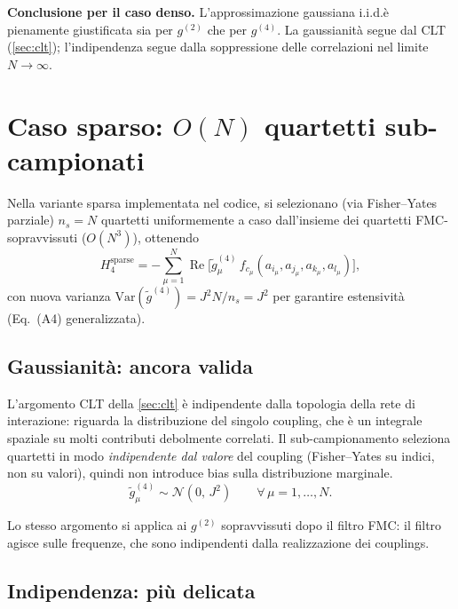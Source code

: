 \documentclass[11pt,a4paper]{article}
\newcommand{\re}{\operatorname{Re}}
\begin{document}
\bigskip
\noindent
\textbf{Conclusione per il caso denso.}
L'approssimazione gaussiana i.i.d.\@ \`e pienamente giustificata sia
per $g^{(2)}$ che per $g^{(4)}$. La gaussianit\`a segue dal CLT
(\cref{sec:clt}); l'indipendenza segue dalla soppressione delle
correlazioni nel limite $N \to \infty$.

\section{Caso sparso: $O(N)$ quartetti
         sub-campionati}\label{sec:sparse}

Nella variante sparsa implementata nel codice, si selezionano
(via Fisher--Yates parziale) $n_s = N$ quartetti uniformemente a caso
dall'insieme dei quartetti FMC-sopravvissuti ($O(N^3)$), ottenendo
\begin{equation}\label{eq:H4_sparse}
  H_4^{\mathrm{sparse}}
  = -\sum_{\mu=1}^{N} \re\!\bigl[
      \tilde g^{(4)}_\mu\, f_{c_\mu}(a_{i_\mu},a_{j_\mu},a_{k_\mu},a_{l_\mu})
    \bigr],
\end{equation}
con nuova varianza $\mathrm{Var}(\tilde g^{(4)}) = J^2 N / n_s = J^2$
per garantire estensivit\`a (Eq.~(A4) generalizzata).

\subsection{Gaussianit\`a: ancora valida}

L'argomento CLT della \cref{sec:clt} \`e indipendente dalla topologia
della rete di interazione: riguarda la distribuzione del singolo
coupling, che \`e un integrale spaziale su molti contributi debolmente
correlati. Il sub-campionamento seleziona quartetti in modo
\emph{indipendente dal valore} del coupling (Fisher--Yates su indici,
non su valori), quindi non introduce bias sulla distribuzione marginale.
\begin{equation}
  \tilde g^{(4)}_\mu
  \sim \mathcal{N}(0,\, J^2) \qquad \forall\, \mu = 1,\ldots,N.
\end{equation}

Lo stesso argomento si applica ai $g^{(2)}$ sopravvissuti dopo il
filtro FMC: il filtro agisce sulle frequenze, che sono indipendenti
dalla realizzazione dei couplings.

\subsection{Indipendenza: pi\`u delicata}\label{sec:sparse_iid}
\end{document}
